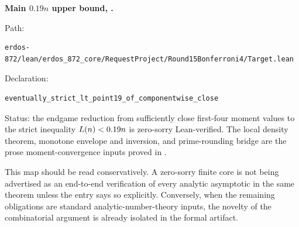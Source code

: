 \medskip
\noindent\textbf{Main $0.19n$ upper bound, .}\par
Path:
\begin{lstlisting}[basicstyle=\ttfamily\scriptsize,breaklines=true,breakatwhitespace=false,columns=fullflexible]
erdos-872/lean/erdos_872_core/RequestProject/Round15Bonferroni4/Target.lean
\end{lstlisting}
Declaration:
\begin{lstlisting}[basicstyle=\ttfamily\scriptsize,breaklines=true,breakatwhitespace=false,columns=fullflexible]
eventually_strict_lt_point19_of_componentwise_close
\end{lstlisting}
Status: the endgame reduction from sufficiently close first-four moment values
to the strict inequality $L(n)<0.19n$ is zero-sorry Lean-verified.  The local
density theorem, monotone envelope and inversion, and prime-rounding bridge are
the prose moment-convergence inputs proved in .
\endgroup

This map should be read conservatively.  A zero-sorry finite core is not being
advertised as an end-to-end verification of every analytic asymptotic in the
same theorem unless the entry says so explicitly.  Conversely, when the
remaining obligations are standard analytic-number-theory inputs, the novelty
of the combinatorial argument is already isolated in the formal artifact.
